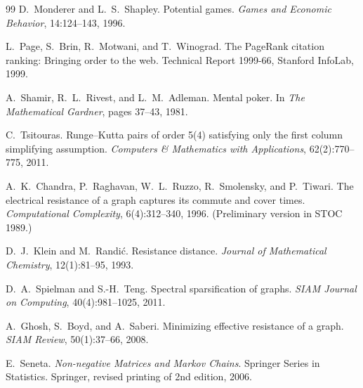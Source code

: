 \documentclass[11pt,a4paper]{article}
\begin{document}
\begin{thebibliography}{99}
D.~Monderer and L.~S.~Shapley.
\newblock Potential games.
\newblock \emph{Games and Economic Behavior}, 14:124--143, 1996.

L.~Page, S.~Brin, R.~Motwani, and T.~Winograd.
\newblock The PageRank citation ranking: Bringing order to the web.
\newblock Technical Report 1999-66, Stanford InfoLab, 1999.

A.~Shamir, R.~L.~Rivest, and L.~M.~Adleman.
\newblock Mental poker.
\newblock In \emph{The Mathematical Gardner}, pages 37--43, 1981.

C.~Tsitouras.
\newblock Runge--Kutta pairs of order 5(4) satisfying only the first column simplifying assumption.
\newblock \emph{Computers \& Mathematics with Applications}, 62(2):770--775, 2011.

A.~K.~Chandra, P.~Raghavan, W.~L.~Ruzzo, R.~Smolensky, and P.~Tiwari.
\newblock The electrical resistance of a graph captures its commute and cover times.
\newblock \emph{Computational Complexity}, 6(4):312--340, 1996.
\newblock (Preliminary version in STOC 1989.)

D.~J.~Klein and M.~Randi\'{c}.
\newblock Resistance distance.
\newblock \emph{Journal of Mathematical Chemistry}, 12(1):81--95, 1993.

D.~A.~Spielman and S.-H.~Teng.
\newblock Spectral sparsification of graphs.
\newblock \emph{SIAM Journal on Computing}, 40(4):981--1025, 2011.

A.~Ghosh, S.~Boyd, and A.~Saberi.
\newblock Minimizing effective resistance of a graph.
\newblock \emph{SIAM Review}, 50(1):37--66, 2008.

E.~Seneta.
\newblock \emph{Non-negative Matrices and Markov Chains}.
\newblock Springer Series in Statistics. Springer, revised printing of 2nd edition, 2006.

\end{thebibliography}
\end{document}
